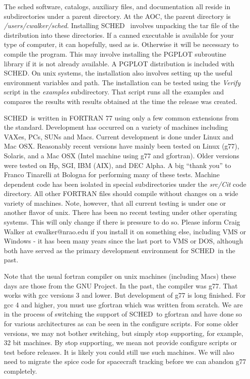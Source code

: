 \documentclass{report}
\newcommand{\sched}{{\sc SCHED}}
\newcommand{\schedb}{{\sc SCHED~}}
\begin{document}
The sched software, catalogs, auxiliary files, and documentation all
reside in subdirectories under a parent directory.  At the AOC, the
parent directory is {\sl /users/cwalker/sched}.  Installing \schedb
involves unpacking the tar file of the distribution into these
directories.  If a canned executable is available for your type of
computer, it can hopefully, used as is.  Otherwise it will be
necessary to compile the program.  This may involve installing the
{\sc PGPLOT} subroutine library if it is not already available.  A
{\sc PGPLOT} distribution is included with \sched.  On unix systems,
the installation also involves setting up the useful environment
variables and path.  The installation can be tested using the {\sl
Verify} script in the {\sl examples} subdirectory.  That script runs
all the examples and compares the results with results obtained at the
time the release was created.

\schedb is written in FORTRAN 77 using only a few common extensions
from the standard.  Development has occurred on a variety of machines
including VAXes, PCs, SUNs and Macs.  Current development is done under
Linux and Mac OSX.  Reasonably recent versions have mainly been tested
on Linux (g77), Solaris, and a Mac OSX (Intel machine using g77 and
gfortran).  Older versions were tested on Hp, SGI, IBM (AIX), and DEC
Alpha.  A big ``thank you'' to Franco Tinarelli at Bologna for
performing many of these tests.  Machine dependent code has been
isolated in special subdirectories under the {\sl src/Cit} code
directory.  All other FORTRAN files should compile without changes on
a wide variety of machines.  Note, however, that all current testing
is under one or another flavor of unix.  There has been no recent
testing under other operating systems.  This will only change if there
is pressure to do so.  Please inform Craig Walker at cwalker@nrao.edu
if you install it on something else, including VMS or Windows - it has
been many years since the last port to VMS or DOS, although both have
served as the primary development environment for \schedb in the past.

Note that the usual fortran compiler on unix machines (including Macs)
these days are those from the GNU Project.  In the past, the compiler
was g77.  That works with gcc versions 3 and lower.  But development
of g77 is long finished.  For gcc 4 and higher, you must use gfortran
which was written from scratch.  We are in the process of switching
the support of \schedb to gfortran and have done so for various
architectures as can be seen in the configure scripts.  For some older
versions, we may not bother switching, but simply stop supporting, for
example, 32 bit machines.  By stop supporting, we mean not provide
configure scripts or test before releases.  It is likely you could
still use such machines.  We will also need to migrate the spice code
for spacecraft tracking before we can abandon g77 completely.
\end{document}
